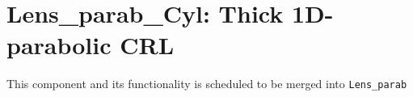 \section{Lens\_parab\_Cyl: Thick 1D-parabolic CRL}

This component and its functionality is scheduled to be merged into \texttt{Lens\_parab}

